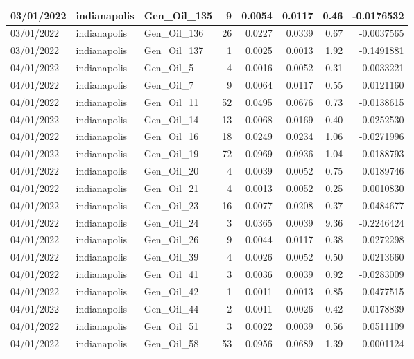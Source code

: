 \documentclass[
  letterpaper,
  DIV=11,
  numbers=noendperiod]{scrartcl}
\begin{document}
\begin{tabular}{l|l|l|r|r|r|r|r}
\hline
03/01/2022 & indianapolis & Gen\_Oil\_135 & 9 & 0.0054 & 0.0117 & 0.46 & -0.0176532\\
\hline
03/01/2022 & indianapolis & Gen\_Oil\_136 & 26 & 0.0227 & 0.0339 & 0.67 & -0.0037565\\
\hline
03/01/2022 & indianapolis & Gen\_Oil\_137 & 1 & 0.0025 & 0.0013 & 1.92 & -0.1491881\\
\hline
04/01/2022 & indianapolis & Gen\_Oil\_5 & 4 & 0.0016 & 0.0052 & 0.31 & -0.0033221\\
\hline
04/01/2022 & indianapolis & Gen\_Oil\_7 & 9 & 0.0064 & 0.0117 & 0.55 & 0.0121160\\
\hline
04/01/2022 & indianapolis & Gen\_Oil\_11 & 52 & 0.0495 & 0.0676 & 0.73 & -0.0138615\\
\hline
04/01/2022 & indianapolis & Gen\_Oil\_14 & 13 & 0.0068 & 0.0169 & 0.40 & 0.0252530\\
\hline
04/01/2022 & indianapolis & Gen\_Oil\_16 & 18 & 0.0249 & 0.0234 & 1.06 & -0.0271996\\
\hline
04/01/2022 & indianapolis & Gen\_Oil\_19 & 72 & 0.0969 & 0.0936 & 1.04 & 0.0188793\\
\hline
04/01/2022 & indianapolis & Gen\_Oil\_20 & 4 & 0.0039 & 0.0052 & 0.75 & 0.0189746\\
\hline
04/01/2022 & indianapolis & Gen\_Oil\_21 & 4 & 0.0013 & 0.0052 & 0.25 & 0.0010830\\
\hline
04/01/2022 & indianapolis & Gen\_Oil\_23 & 16 & 0.0077 & 0.0208 & 0.37 & -0.0484677\\
\hline
04/01/2022 & indianapolis & Gen\_Oil\_24 & 3 & 0.0365 & 0.0039 & 9.36 & -0.2246424\\
\hline
04/01/2022 & indianapolis & Gen\_Oil\_26 & 9 & 0.0044 & 0.0117 & 0.38 & 0.0272298\\
\hline
04/01/2022 & indianapolis & Gen\_Oil\_39 & 4 & 0.0026 & 0.0052 & 0.50 & 0.0213660\\
\hline
04/01/2022 & indianapolis & Gen\_Oil\_41 & 3 & 0.0036 & 0.0039 & 0.92 & -0.0283009\\
\hline
04/01/2022 & indianapolis & Gen\_Oil\_42 & 1 & 0.0011 & 0.0013 & 0.85 & 0.0477515\\
\hline
04/01/2022 & indianapolis & Gen\_Oil\_44 & 2 & 0.0011 & 0.0026 & 0.42 & -0.0178839\\
\hline
04/01/2022 & indianapolis & Gen\_Oil\_51 & 3 & 0.0022 & 0.0039 & 0.56 & 0.0511109\\
\hline
04/01/2022 & indianapolis & Gen\_Oil\_58 & 53 & 0.0956 & 0.0689 & 1.39 & 0.0001124\\

\end{tabular}
\end{document}

